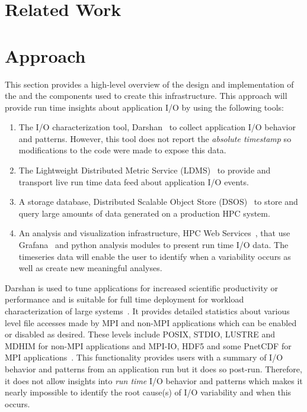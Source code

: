 \documentclass[conference]{IEEEtran}
\begin{document}
\section{Related Work}

\section{Approach}

This section provides a high-level overview of the design and implementation of the \Darshan and the components used to create this infrastructure. 
This approach will provide run time insights about application I/O by using the following tools:
\begin{enumerate}
    \item The I/O characterization tool, Darshan~\cite{Darshan} to collect application I/O behavior and patterns. However, this tool does not report the \emph{absolute timestamp} so modifications to the code were made to expose this data.
    \item The Lightweight Distributed Metric Service (LDMS)~\cite{ldmsgithubwiki} to provide and transport live run time data feed about application I/O events.
    \item A storage database, Distributed Scalable Object Store (DSOS)~\cite{sosgithub} to store and query large amounts of data generated on a production HPC system.
    \item An analysis and visualization infrastructure, HPC Web Services~\cite{ClusterAV}, that use Grafana~\cite{grafana-website} and python analysis modules to present run time I/O data. The timeseries data will enable the user to identify when a variability occurs as well as create new meaningful analyses.
\end{enumerate}

Darshan is used to tune applications for increased scientific productivity or performance and is suitable for full time deployment for workload characterization of large systems~\cite{darshan-webpage}. It provides detailed statistics about various level file accesses made by MPI and non-MPI applications which can be enabled or disabled as desired. These levels include POSIX, STDIO, LUSTRE and MDHIM for non-MPI applications and MPI-IO, HDF5 and some PnetCDF for MPI applications~\cite{darshan-runtime}. This functionality provides users with a summary of I/O behavior and patterns from an application run but it does so post-run. Therefore, it does not allow insights into \emph{run time} I/O behavior and patterns which makes it nearly impossible to identify the root cause(s) of I/O variability and when this occurs. 
\end{document}
